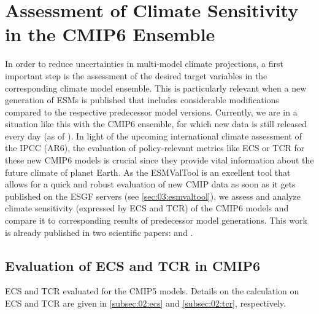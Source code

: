 


\chapter{Assessment of Climate Sensitivity in the \acs{CMIP}6 Ensemble}
\label{ch:04:papers_ecs_tcr_assessment}

In order to reduce uncertainties in multi-model climate projections, a first
important step is the assessment of the desired target variables in the
corresponding climate model ensemble. This is particularly relevant when a new
generation of \acp{ESM} is published that includes considerable modifications
compared to the respective predecessor model versions. Currently, we are in a
situation like this with the \acs{CMIP}6 ensemble, for which new data is still
released every day (as of \TheMonth{}). In light of the upcoming international
climate assessment of the \ac{IPCC} (\ac{AR6}), the evaluation of
policy-relevant metrics like \ac{ECS} or \ac{TCR} for these new \acs{CMIP}6
models is crucial since they provide vital information about the future climate
of planet Earth. As the \ac{ESMValTool} is an excellent tool that allows for a
quick and robust evaluation of new \ac{CMIP} data as soon as it gets published
on the \ac{ESGF} servers (see \cref{sec:03:esmvaltool}), we assess and analyze
climate sensitivity (expressed by \ac{ECS} and \ac{TCR}) of the \acs{CMIP}6
models and compare it to corresponding results of predecessor model
generations. This work is already published in two scientific papers:
\textcite{Bock2020} and \textcite{Meehl2020}.


\section{Evaluation of \acs{ECS} and \acs{TCR} in \acs{CMIP}6}
\label{sec:04:evaluation_ecs_and_tcr}



\begin{table}[t]
  \centering
  \caption{\acf{ECS} and \acf{TCR} evaluated for the \acs{CMIP}5 models.
    Details on the calculation on \acs{ECS} and \acs{TCR} are given in
    \cref{subsec:02:ecs} and \cref{subsec:02:tcr}, respectively.}
  \label{tab:04:ecs_tcr_cmip5}
\end{table}




